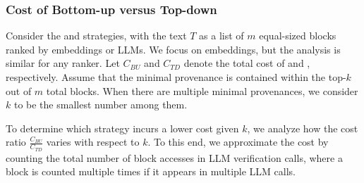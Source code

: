 









\subsubsection{Cost of Bottom-up versus Top-down} 
\label{subsubsec:bottom-top}
\leavevmode 

Consider the  and  strategies, with the text $T$ as a list of $m$ equal-sized blocks ranked by  embeddings or LLMs. We focus on embeddings, but the analysis is similar for any ranker.  
Let $C_{BU}$ and $C_{TD}$ denote the total cost of  and , respectively. Assume that the minimal provenance is contained within the top-$k$ out of $m$ total blocks. When there are multiple  minimal provenances, we consider $k$ to be the smallest number among them. 

To determine which strategy incurs a lower cost given $k$, we analyze how the cost ratio $\frac{C_{BU}}{C_{TD}}$ varies with respect to $k$.
To this end, we approximate the cost by counting the total number of block accesses in LLM verification calls,  where a block is counted multiple times if it appears in multiple LLM calls. 

